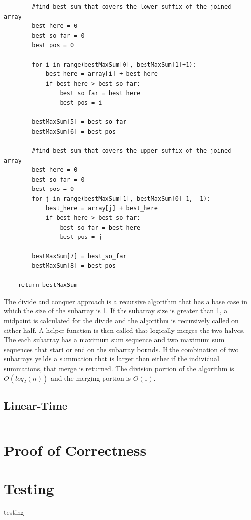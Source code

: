 \documentclass[letWterpaper,10pt,titlepage]{article}
\begin{document}
\begin{lstlisting}
        #find best sum that covers the lower suffix of the joined array
        best_here = 0
        best_so_far = 0
        best_pos = 0

        for i in range(bestMaxSum[0], bestMaxSum[1]+1):
            best_here = array[i] + best_here
            if best_here > best_so_far:
                best_so_far = best_here
                best_pos = i

        bestMaxSum[5] = best_so_far
        bestMaxSum[6] = best_pos

        #find best sum that covers the upper suffix of the joined array
        best_here = 0
        best_so_far = 0
        best_pos = 0
        for j in range(bestMaxSum[1], bestMaxSum[0]-1, -1):
            best_here = array[j] + best_here
            if best_here > best_so_far:
                best_so_far = best_here
                best_pos = j

        bestMaxSum[7] = best_so_far
        bestMaxSum[8] = best_pos

    return bestMaxSum
\end{lstlisting}

The divide and conquer approach is a recursive algorithm that has a base case in which the size of the subarray is 1. If the subarray size is greater than 1, a midpoint is calculated for the divide and the algorithm is recursively called on either half. A helper function is then called that logically merges the two halves. The each subarray has a maximum sum sequence and two maximum sum sequences that start or end on the subarray bounds. If the combination of two subarrays yeilds a summation that is larger than either if the individual summations, that merge is returned. The division portion of the algorithm is $O(log_2(n))$ and the merging portion is $O(1)$.

\subsection{Linear-Time}

\begin{lstlisting}
\end{lstlisting}


\section{Proof of Correctness}

\section{Testing}
testing
\end{document}
